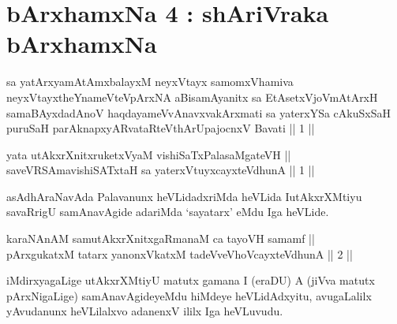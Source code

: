 

\chapter{bArxhamxNa 4 : shAriVraka bArxhamxNa}


\begin{kandikeshl}
sa yatArxyamAtAmxbalayxM neyxVtayx samomxVhamiva neyxVtayxtheYnameVteV\break pArxNA aBisamAyanitx sa EtAsetxVjoVmAtArxH samaBAyxdadAnoV haqdaya\-\break meVvAnavxvakArxmati sa yaterxYSa cAkuSxSaH puruSaH parAknapxyARvataR\-\break teV\s thArUpajocnxV Bavati || 1 ||
\end{kandikeshl}



\begin{shl}
yata utAkxrXnitxruketxVyaM vishiSaTxPalasaMgateVH || \\
saveVRSAmavishiSATx\s taH sa yaterxVtuyxcayxteV\s dhunA \hfill || 1 ||
  
\end{shl}

\begin{artha}
asAdhAraNavAda Palavanunx heVLidadxriMda heVLida I\break utAkxrXMtiyu
savaRrigU samAnavAgide adariMda `sayatarx' eMdu Iga heVLide.
\end{artha}


\begin{shl}
karaNAnAM samutAkxrXnitxgaRmanaM ca tayoVH samamf || \\
pArxgukatxM tatarx yanonxVkatxM tadeVveVhoVcayxteV\s dhunA \hfill || 2 ||
  
\end{shl}

\begin{artha}
iMdirxyagaLige utAkxrXMtiyU matutx gamana I (eraDU) A (jiVva matutx
pArxNigaLige) samAnavAgideyeMdu hiMdeye heVLidAdxyitu, avugaLalilx
yAvudanunx heVLilalxvo adanenxV ililx Iga heVLuvudu.
\end{artha}

